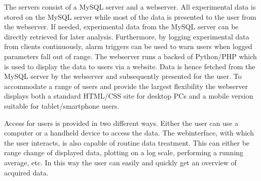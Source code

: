 The servers consist of a MySQL server and a webserver. All experimental data is
stored on the MySQL server while most of the data is presented to the user from
the webserver. If needed, experimental data from the MySQL server can be
directly retrieved for later analysis. Furthermore, by logging experimental
data from clients continuously, alarm triggers can be used to warn users when
logged parameters fall out of range. The webserver runs a backed of Python/PHP
which is used to display the data to users via a website. Data is hence fetched
from the MySQL server by the webserver and subsequently presented for the user.
To accommodate a range of users and provide the largest flexibility the
webserver displays both a standard HTML/CSS site for desktop PCs and a mobile
version suitable for tablet/smartphone users.

Access for users is provided in two different ways. Either the user can use a
computer or a handheld device to access the data. The webinterface, with which
the user interacts, is also capable of routine data treatment. This can either
be range change of displayed data, plotting on a log scale, performing a
running average, etc. In this way the user can easily and quickly get an
overview of acquired data.
